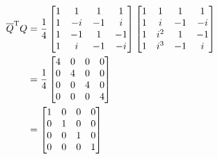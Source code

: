 \documentclass[a4paper]{article}
\begin{document}
\begin{align*}
	\overline{Q}^{\textsc{T}}Q & = \frac{1}{4}
	\begin{bmatrix}
		1 & 1 & 1 & 1 \\
		1 & -i & -1 & i \\
		1 & -1 & 1 & -1 \\
		1 & i & -1 & -i \\
	\end{bmatrix}
	\begin{bmatrix}
		1 & 1 & 1 & 1 \\
		1 & i & -1 & -i \\
		1 & i^{2} & 1 & -1 \\
		1 & i^{3} & -1 & i \\
	\end{bmatrix} \\
	& = \frac{1}{4}
	\begin{bmatrix}
		4 & 0 & 0 & 0 \\
		0 & 4 & 0 & 0 \\
		0 & 0 & 4 & 0 \\
		0 & 0 & 0 & 4 \\
	\end{bmatrix} \\
	& =
	\begin{bmatrix}
		1 & 0 & 0 & 0 \\
		0 & 1 & 0 & 0 \\
		0 & 0 & 1 & 0 \\
		0 & 0 & 0 & 1 \\
	\end{bmatrix}
\end{align*}

\newpage
\end{document}
